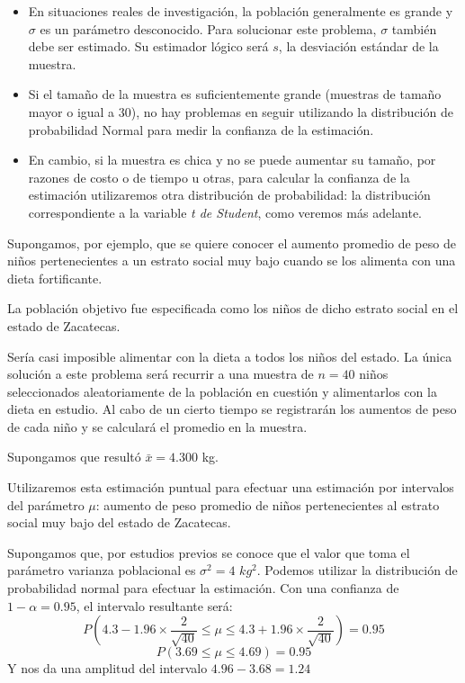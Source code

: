 \documentclass[
  10pt,
  ignorenonframetext,
]{beamer}
\providecommand{\tightlist}{%
  \setlength{\itemsep}{0pt}\setlength{\parskip}{0pt}}
\begin{document}
\begin{frame}{}
\protect\hypertarget{section-7}{}
\begin{itemize}
\tightlist
\item
  En situaciones reales de investigación, la población generalmente es
  grande y \(\sigma\) es un parámetro desconocido. Para solucionar este
  problema, \(\sigma\) también debe ser estimado. Su estimador lógico
  será \(s\), la desviación estándar de la muestra.
\item
  Si el tamaño de la muestra es suficientemente grande (muestras de
  tamaño mayor o igual a 30), no hay problemas en seguir utilizando la
  distribución de probabilidad Normal para medir la confianza de la
  estimación.
\item
  En cambio, si la muestra es chica y no se puede aumentar su tamaño,
  por razones de costo o de tiempo u otras, para calcular la confianza
  de la estimación utilizaremos otra distribución de probabilidad: la
  distribución correspondiente a la variable \emph{t de Student}, como
  veremos más adelante.
\end{itemize}
\end{frame}

\begin{frame}{}
\protect\hypertarget{section-8}{}
Supongamos, por ejemplo, que se quiere conocer el aumento promedio de
peso de niños pertenecientes a un estrato social muy bajo cuando se los
alimenta con una dieta fortificante.

La población objetivo fue especificada como los niños de dicho estrato
social en el estado de Zacatecas.

Sería casi imposible alimentar con la dieta a todos los niños del
estado. La única solución a este problema será recurrir a una muestra de
\(n = 40\) niños seleccionados aleatoriamente de la población en
cuestión y alimentarlos con la dieta en estudio. Al cabo de un cierto
tiempo se registrarán los aumentos de peso de cada niño y se calculará
el promedio en la muestra.

Supongamos que resultó \(\bar{x}= 4.300\) kg.
\end{frame}

\begin{frame}{}
\protect\hypertarget{section-9}{}
Utilizaremos esta estimación puntual para efectuar una estimación por
intervalos del parámetro \(\mu\): aumento de peso promedio de niños
pertenecientes al estrato social muy bajo del estado de Zacatecas.

Supongamos que, por estudios previos se conoce que el valor que toma el
parámetro varianza poblacional es \(\sigma^2=4\) \(kg^2\). Podemos
utilizar la distribución de probabilidad normal para efectuar la
estimación. Con una confianza de \(1-\alpha=0.95\), el intervalo
resultante será:
\[ P\left(4.3 - 1.96 \times \frac{2}{\sqrt{40}}  \le \mu \le 4.3 +1.96 \times \frac{2}{\sqrt{40}} \right)=0.95 \]
\[P(3.69 \le \mu \le 4.69) = 0.95\] Y nos da una amplitud del intervalo
\(4.96-3.68=1.24\)
\end{frame}
\end{document}
